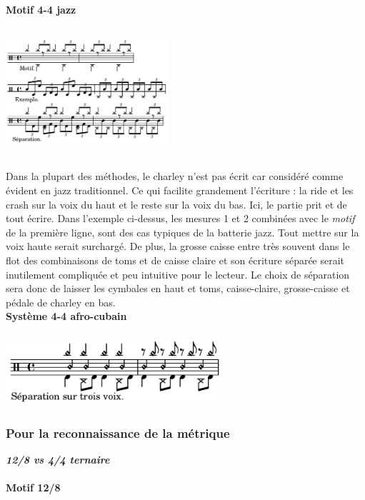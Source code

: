 
\textbf{Motif 4-4 jazz}\\\\
\includegraphics[height=45mm, width=60mm]{z_images/3_methodes/2_systemes/1_separation_4-4_jazz.png}\\\\
Dans la plupart des méthodes, le charley n’est pas écrit car considéré comme évident en jazz traditionnel. Ce qui facilite grandement l’écriture : la ride et les crash sur la voix du haut et le reste sur la voix du bas. Ici, le partie prit et de tout écrire. Dans l’exemple ci-dessus, les mesures 1 et 2 combinées avec le \textit{motif} de la première ligne, sont des cas typiques de la batterie jazz. Tout mettre sur la voix haute serait surchargé. De plus, la grosse caisse entre très souvent dans le flot des combinaisons de toms et de caisse claire et son écriture séparée serait inutilement compliquée et peu intuitive pour le lecteur. Le choix de séparation sera donc de laisser les cymbales en haut et toms, caisse-claire, grosse-caisse et pédale de charley en bas.\\

\textbf{Système 4-4 afro-cubain}\\\\
\includegraphics[height=25mm, width=80mm]{z_images/3_methodes/2_systemes/2_separation_afro-cubain.png}
\subsubsection{Pour la reconnaissance de la métrique}
\textit{\textbf{12/8 vs 4/4 ternaire}}\\\\
\textbf{Motif 12/8}\\\\

